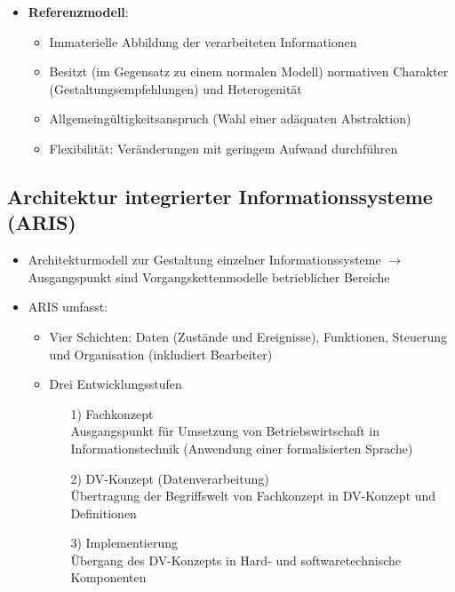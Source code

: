 \documentclass[12pt,a4paper]{article}
\begin{document}
\begin{itemize}
   \item \textbf{Referenzmodell}:
      \begin{itemize}
         \item Immaterielle Abbildung der verarbeiteten Informationen
         \item Besitzt (im Gegensatz zu einem normalen Modell) normativen Charakter (Gestaltungsempfehlungen) und Heterogenität
         \item Allgemeingültigkeitsanspruch (Wahl einer adäquaten Abstraktion)
         \item Flexibilität: Veränderungen mit geringem Aufwand durchführen
      \end{itemize}
\end{itemize}


\vspace*{0.5cm}
\subsection{Architektur integrierter Informationssysteme (ARIS)} %
\begin{itemize}
   \item Architekturmodell zur Gestaltung einzelner Informationssysteme
          $\rightarrow$ Ausgangspunkt sind Vorgangskettenmodelle betrieblicher Bereiche
   \item ARIS umfasst:
      \begin{itemize}
        \item Vier Schichten: Daten (Zustände und Ereignisse), Funktionen, Steuerung und Organisation (inkludiert Bearbeiter)
        \item Drei Entwicklungsstufen
	        \begin{itemize}
	            \item[1)] Fachkonzept\\
	                  Ausgangspunkt für Umsetzung von Betriebswirtschaft in Informationstechnik
	                  (Anwendung einer formalisierten Sprache)
	            \item[2)] DV-Konzept (Datenverarbeitung)\\
	                  Übertragung der Begriffswelt von Fachkonzept in DV-Konzept und Definitionen
	            \item[3)] Implementierung\\
	                  Übergang des DV-Konzepts in Hard- und softwaretechnische Komponenten
	        \end{itemize}
      \end{itemize}
\end{itemize}
\end{document}
